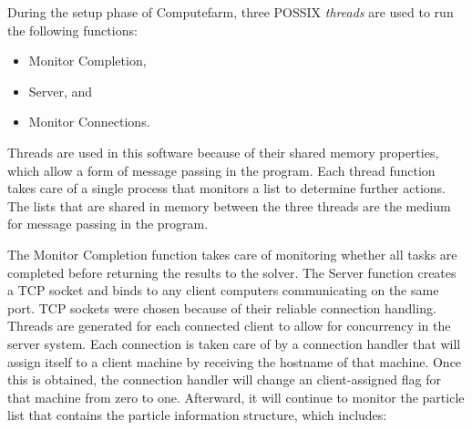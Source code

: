 During the setup phase of Computefarm, three POSSIX \textit{threads} are used to run the following functions:
\begin{itemize}
    \item Monitor Completion,
    \item Server, and
    \item Monitor Connections. 
\end{itemize}

Threads are used in this software because of their shared memory properties, which allow a form of message passing in the program. Each thread function takes care of a single process that monitors a list to determine further actions. The lists that are shared in memory between the three threads are the medium for message passing in the program. 

The Monitor Completion function takes care of monitoring whether all tasks are completed before returning the results to the solver. The Server function creates a TCP socket and binds to any client computers communicating on the same port. TCP sockets were chosen because of their reliable connection handling. Threads are generated for each connected client to allow for concurrency in the server system. Each connection is taken care of by a connection handler that will assign itself to a client machine by receiving the hostname of that machine. Once this is obtained, the connection handler will change an client-assigned flag for that machine from zero to one. Afterward, it will continue to monitor the particle list that contains the particle information structure, which includes: 

